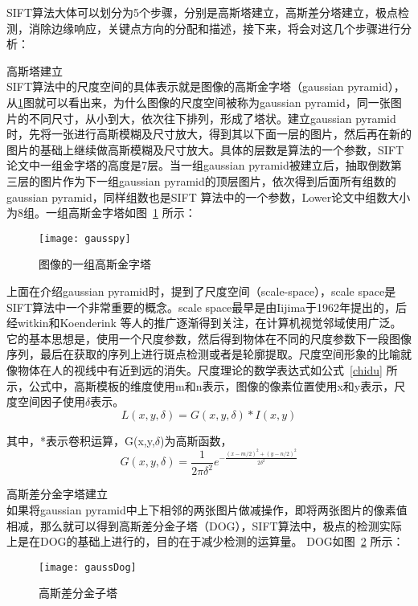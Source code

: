 SIFT算法大体可以划分为5个步骤，分别是高斯塔建立，高斯差分塔建立，极点检测，消除边缘响应，关键点方向的分配和描述，接下来，将会对这几个步骤进行分析：
\begin{compactenum}
\item 高斯塔建立\\SIFT算法中的尺度空间的具体表示就是图像的高斯金字塔（gaussian pyramid），从\ref{fig:gausspy}图就可以看出来，为什么图像的尺度空间被称为gaussian pyramid，同一张图片的不同尺寸，从小到大，依次往下排列，形成了塔状。建立gaussian pyramid时，先将一张进行高斯模糊及尺寸放大，得到其以下面一层的图片，然后再在新的图片的基础上继续做高斯模糊及尺寸放大。具体的层数是算法的一个参数，SIFT论文中一组金字塔的高度是7层。当一组gaussian pyramid被建立后，抽取倒数第三层的图片作为下一组gaussian pyramid的顶层图片，依次得到后面所有组数的gaussian pyramid，同样组数也是SIFT 算法中的一个参数，Lower论文中组数大小为8组。一组高斯金字塔如图~\ref{fig:gausspy} 所示：
\begin{figure}[htp]
\centering
\texttt{[image: gausspy]}
\caption{图像的一组高斯金字塔}
\label{fig:gausspy}
\end{figure}

上面在介绍gaussian pyramid时，提到了尺度空间（scale-space），scale space是SIFT算法中一个非常重要的概念。scale space最早是由Iijima于1962年提出的，后经witkin和Koenderink 等人的推广逐渐得到关注，在计算机视觉邻域使用广泛。它的基本思想是，使用一个尺度参数，然后得到物体在不同的尺度参数下一段图像序列，最后在获取的序列上进行斑点检测或者是轮廓提取。尺度空间形象的比喻就像物体在人的视线中有近到远的消失。尺度理论的数学表达式如公式~\ref{chidu} 所示，公式中，高斯模板的维度使用m和n表示，图像的像素位置使用x和y表示，尺度空间因子使用$\delta$表示。
\begin{equation}\label{chidu}
L(x,y,\delta)=G(x,y,\delta)*I(x,y)
\end{equation}

其中，*表示卷积运算，G(x,y,$\delta$)为高斯函数，
\begin{equation}\label{gauss}
G(x,y,\delta)=\frac{1}{2\pi{\delta}^2}e^{-\frac{(x-m/2)^2+(y-n/2)^2}{2\delta^2}}
\end{equation}

\item 高斯差分金字塔建立\\如果将gaussian pyramid中上下相邻的两张图片做减操作，即将两张图片的像素值相减，那么就可以得到高斯差分金子塔（DOG），SIFT算法中，极点的检测实际上是在DOG的基础上进行的，目的在于减少检测的运算量。 DOG如图~\ref{fig:gaussDog} 所示：
\begin{figure}[htp]
\centering
\texttt{[image: gaussDog]}
\caption{高斯差分金子塔}
\label{fig:gaussDog}
\end{figure}


\end{compactenum}
